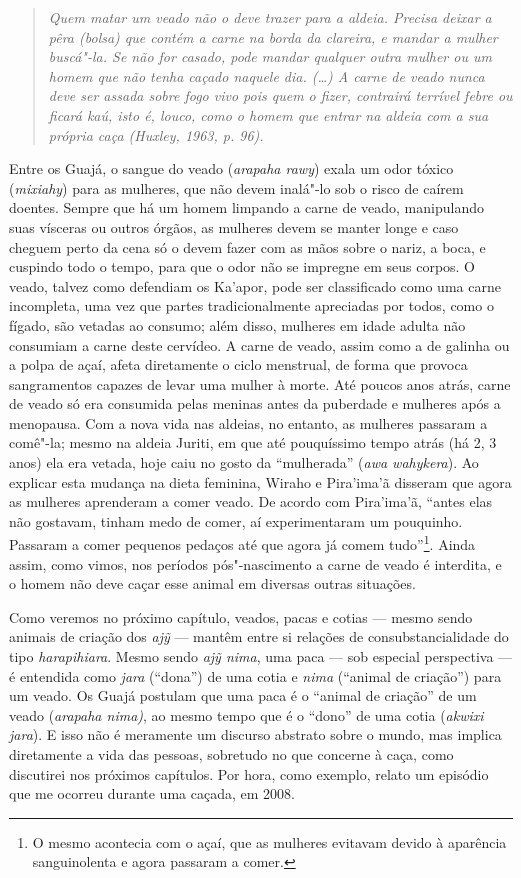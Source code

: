 \begin{quote}
\emph{Quem matar um veado não o deve trazer para a aldeia. Precisa deixar a
\emph{pêra} (bolsa) que contém a carne na borda da clareira, e mandar a
mulher buscá"-la. Se não for casado, pode mandar qualquer outra mulher ou
um homem que não tenha caçado naquele dia. (\ldots{}) A carne de veado nunca
deve ser assada sobre fogo vivo pois quem o fizer, contrairá terrível
febre ou ficará \emph{kaú}, isto é, louco, como o homem que entrar na
aldeia com a sua própria caça (Huxley, 1963, p. 96).}
\end{quote}

Entre os Guajá, o sangue do veado (\emph{arapaha rawy}) exala um odor
tóxico (\emph{mixiahy}) para as mulheres, que não devem inalá"-lo sob o
risco de caírem doentes. Sempre que há um homem limpando a carne de
veado, manipulando suas vísceras ou outros órgãos, as mulheres devem se
manter longe e caso cheguem perto da cena só o devem fazer com as mãos
sobre o nariz, a boca, e cuspindo todo o tempo, para que o odor não se
impregne em seus corpos. O veado, talvez como defendiam os Ka'apor, pode
ser classificado como uma carne incompleta, uma vez que partes
tradicionalmente apreciadas por todos, como o fígado, são vetadas ao
consumo; além disso, mulheres em idade adulta não consumiam a carne
deste cervídeo. A carne de veado, assim como a de galinha ou a polpa de
açaí, afeta diretamente o ciclo menstrual, de forma que provoca
sangramentos capazes de levar uma mulher à morte. Até poucos anos atrás,
carne de veado só era consumida pelas meninas antes da puberdade e
mulheres após a menopausa. Com a nova vida nas aldeias, no entanto, as
mulheres passaram a comê"-la; mesmo na aldeia Juriti, em que até
pouquíssimo tempo atrás (há 2, 3 anos) ela era vetada, hoje caiu no
gosto da ``mulherada'' (\emph{awa wahykera}). Ao explicar esta mudança na
dieta feminina, Wiraho e Pira'ima'ã disseram que agora as mulheres
aprenderam a comer veado. De acordo com Pira'ima'ã, ``antes elas não
gostavam, tinham medo de comer, aí experimentaram um pouquinho. Passaram
a comer pequenos pedaços até que agora já comem tudo''\footnote{O mesmo
  acontecia com o açaí, que as mulheres evitavam devido à aparência
  sanguinolenta e agora passaram a comer.}. Ainda assim, como vimos, nos
períodos pós"-nascimento a carne de veado é interdita, e o homem não deve
caçar esse animal em diversas outras situações.

Como veremos no próximo capítulo, veados, pacas e cotias --- mesmo sendo
animais de criação dos \emph{ajỹ} --- mantêm entre si relações de
consubstancialidade do tipo \emph{harapihiara}. Mesmo sendo \emph{ajỹ
nima}, uma paca --- sob especial perspectiva --- é entendida como
\emph{jara} (``dona'') de uma cotia e \emph{nima} (``animal de criação'')
para um veado. Os Guajá postulam que uma paca é o ``animal de criação'' de
um veado (\emph{arapaha nima)}, ao mesmo tempo que é o ``dono'' de uma
cotia (\emph{akwixi jara}). E isso não é meramente um discurso abstrato
sobre o mundo, mas implica diretamente a vida das pessoas, sobretudo no
que concerne à caça, como discutirei nos próximos capítulos. Por hora,
como exemplo, relato um episódio que me ocorreu durante uma caçada, em
2008.

